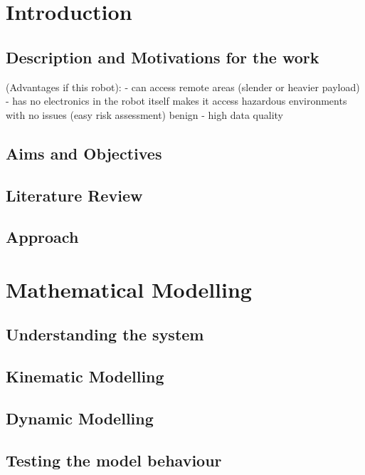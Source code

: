 \documentclass[a4paper,12pt]{report}
\begin{document}
\pagebreak

\tableofcontents

\pagebreak

\begin{abstract}
    \ldots
\end{abstract}

\chapter{Introduction}
\section{Description and Motivations for the work}
(Advantages if this robot):
- can access remote areas (slender or heavier payload)
- has no electronics in the robot itself makes it access hazardous environments with no issues (easy risk assessment) benign 
- high data quality 
\section{Aims and Objectives}
\section{Literature Review}
\section{Approach}%

\chapter{Mathematical Modelling}
\section{Understanding the system}
\section{Kinematic Modelling}
\section{Dynamic Modelling}
\section{Testing the model behaviour}
\end{document}
